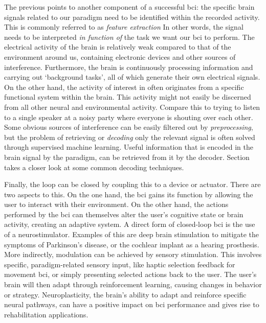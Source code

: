 The previous points to another component of a successful \ac{bci}: the specific
brain signals related to our paradigm need to be identified within the recorded
activity.
This is commonly referred to as \emph{feature extraction}
In other words, the signal needs to be interpreted \emph{in function of} the
task we want our \ac{bci} to perform.
The electrical activity of the brain is relatively weak compared to that of the
environment around us, containing electronic devices and other sources of
interference.
Furthermore, the brain is continuously processing information and carrying out
`background tasks', all of which generate their own electrical signals.
On the other hand, the activity of interest in often
originates from a specific functional system within the brain.
This activity might not easily be discerned from all other neural and
environmental activity.
Compare this to trying to listen to a single speaker at a noisy party where
everyone is shouting over each other.
Some obvious sources of interference can be easily filtered out by
\emph{preprocessing}, but the problem of retrieving or \emph{decoding} only the
relevant signal is often solved through supervised machine learning.
Useful information that is encoded in the brain signal by the paradigm,
can be retrieved from it by the decoder.
Section~\label{sec:bci-decoding} takes a closer look at some common decoding
techniques.

Finally, the loop can be closed by coupling this to a
device or actuator.
There are two aspects to this.
On the one hand, the \ac{bci} gains its function by allowing the user to interact
with their environment.
On the other hand, the actions performed by the \ac{bci} can themselves alter
the user's cognitive state or brain activity, creating an adaptive system.
A direct form of closed-loop \ac{bci} is the use of a neurostimulator.
Examples of this are deep brain stimulation to mitigate the symptoms of
Parkinson's disease, or the cochlear implant as a hearing prosthesis.
More indirectly, modulation can be achieved by sensory stimulation.
This involves specific, paradigm-related sensory input, like haptic selection
feedback for movement \ac{bci}, or simply presenting selected actions
back to the user.
The user's brain will then adapt through reinforcement learning, causing
changes in behavior or strategy.
Neuroplasticity, the brain's ability to adapt and reinforce specific neural
pathways, can have a positive impact on \ac{bci} performance and gives rise to
rehabilitation applications.


